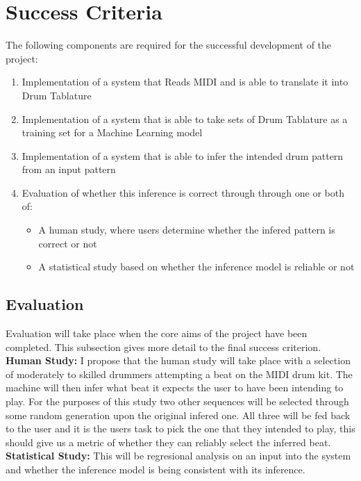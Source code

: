 \documentclass[12pt,a4]{article}
\begin{document}
	\section{Success Criteria}
The following components are required for the successful development of the project:
		\begin{enumerate}
			\item Implementation of a system that Reads MIDI and is able to translate it into Drum Tablature
			\item Implementation of a system that is able to take sets of Drum Tablature as a training set for a Machine Learning model
			\item Implementation of a system that is able to infer the intended drum pattern from an input pattern
			\item Evaluation of whether this inference is correct through through one or both of:
				\begin{itemize}
					\item A human study, where users determine whether the infered pattern is correct or not
					\item A statistical study based on whether the inference model is reliable or not
				\end{itemize}
		\end{enumerate}
		\subsection{Evaluation}
Evaluation will take place when the core aims of the project have been completed. This subsection gives more detail to the final success criterion.\\
{\bf Human Study:} I propose that the human study will take place with a selection of moderately to skilled drummers attempting a beat on the MIDI drum kit. The machine will then infer what beat it expects the user to have been intending to play. For the purposes of this study two other sequences will be selected through some random generation upon the original infered one. All three will be fed back to the user and it is the users task to pick the one that they intended to play, this should give us a metric of whether they can reliably select the inferred beat.\\
{\bf Statistical Study:} This will be regresional analysis on an input into the system and whether the inference model is being consistent with its inference.
\end{document}
